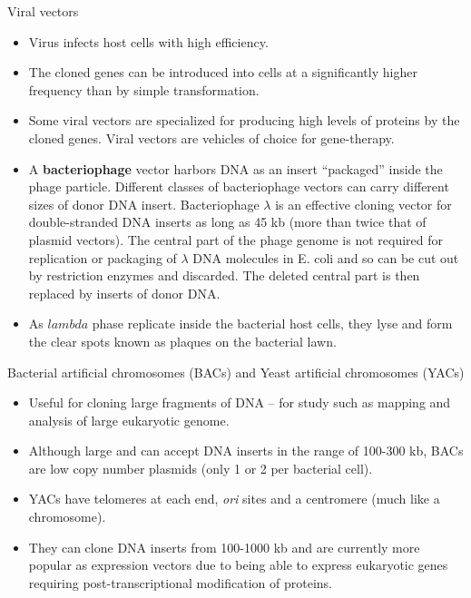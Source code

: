\documentclass[11pt,dvipsnames,ignorenonframetext,aspectratio=169]{beamer}
\providecommand{\tightlist}{%
  \setlength{\itemsep}{0pt}\setlength{\parskip}{0pt}}
\begin{document}
\begin{frame}{Viral vectors}
\protect\hypertarget{viral-vectors}{}
\begin{itemize}
\tightlist
\item
  Virus infects host cells with high efficiency.
\item
  The cloned genes can be introduced into cells at a significantly
  higher frequency than by simple transformation.
\item
  Some viral vectors are specialized for producing high levels of
  proteins by the cloned genes. Viral vectors are vehicles of choice for
  gene-therapy.
\item
  A \textbf{bacteriophage} vector harbors DNA as an insert ``packaged''
  inside the phage particle. Different classes of bacteriophage vectors
  can carry different sizes of donor DNA insert. Bacteriophage
  \(\lambda\) is an effective cloning vector for double-stranded DNA
  inserts as long as 45 kb (more than twice that of plasmid vectors).
  The central part of the phage genome is not required for replication
  or packaging of \(\lambda\) DNA molecules in E. coli and so can be cut
  out by restriction enzymes and discarded. The deleted central part is
  then replaced by inserts of donor DNA.
\item
  As \(lambda\) phase replicate inside the bacterial host cells, they
  lyse and form the clear spots known as plaques on the bacterial lawn.
\end{itemize}
\end{frame}

\begin{frame}{Bacterial artificial chromosomes (BACs) and Yeast
artificial chromosomes (YACs)}
\protect\hypertarget{bacterial-artificial-chromosomes-bacs-and-yeast-artificial-chromosomes-yacs}{}
\begin{itemize}
\tightlist
\item
  Useful for cloning large fragments of DNA -- for study such as mapping
  and analysis of large eukaryotic genome.
\item
  Although large and can accept DNA inserts in the range of 100-300 kb,
  BACs are low copy number plasmids (only 1 or 2 per bacterial cell).
\item
  YACs have telomeres at each end, \emph{ori} sites and a centromere
  (much like a chromosome).
\item
  They can clone DNA inserts from 100-1000 kb and are currently more
  popular as expression vectors due to being able to express eukaryotic
  genes requiring post-transcriptional modification of proteins.
\end{itemize}
\end{frame}
\end{document}
